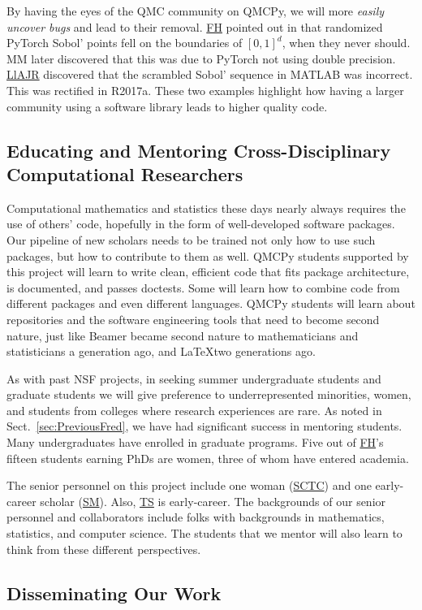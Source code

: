 \documentclass[11pt]{NSFamsart}
\newcommand{\FH}{\hyperlink{FHlink}{FH}\xspace}
\newcommand{\SM}{\hyperlink{SMlink}{SM}\xspace}
\newcommand{\SCTC}{\hyperlink{SCTClink}{SCTC}\xspace}
\newcommand{\TS}{\hyperlink{TSlink}{TS}\xspace}
\newcommand{\LlAJR}{\hyperlink{LlAJRlink}{LlAJR}\xspace}
\begin{document}
By having the eyes of the QMC community on QMCPy, we will more \emph{easily uncover bugs} and lead to their removal.  \FH  pointed out in \cite{PyTorchFirstPt2020a} that randomized PyTorch Sobol' points fell on the boundaries of $[0,1]^d$, when they never should.  MM later discovered that this was due to PyTorch not using double precision.  \LlAJR discovered that the scrambled Sobol' sequence in MATLAB was incorrect.  This was rectified in R2017a.  These two examples highlight how having a larger community using a software library leads to higher quality code.

\subsection{Educating and Mentoring Cross-Disciplinary Computational Researchers}
Computational mathematics and statistics these days nearly always requires the use of others' code, hopefully in the form of well-developed software packages.  Our pipeline of new scholars needs to be trained not only how to use such packages, but how to contribute to them as well.  QMCPy students supported by this project will learn to  write clean, efficient code that fits package architecture, is documented, and passes doctests.  Some will learn how to combine code from different packages and even different languages.  QMCPy students will learn about repositories and the software engineering tools that need to become second nature, just like Beamer became second nature to mathematicians and statisticians a generation ago, and \LaTeX two generations ago.

As with past NSF projects, in seeking summer undergraduate students and graduate students we will give preference to underrepresented minorities, women, and students from colleges where research experiences are rare.  As noted in Sect.\ \ref{sec:PreviousFred}, we have had significant success in mentoring students.  Many undergraduates have enrolled in graduate programs.  Five out of \FH's fifteen students earning PhDs are women, three of whom have entered academia.

The senior personnel on this project include one woman (\SCTC) and one early-career scholar (\SM).  Also, \TS is early-career.  The backgrounds of our senior personnel and collaborators include folks with backgrounds in mathematics, statistics, and computer science.  The students  that we mentor will also learn to think from these different perspectives.

\subsection{Disseminating Our Work}
\end{document}
